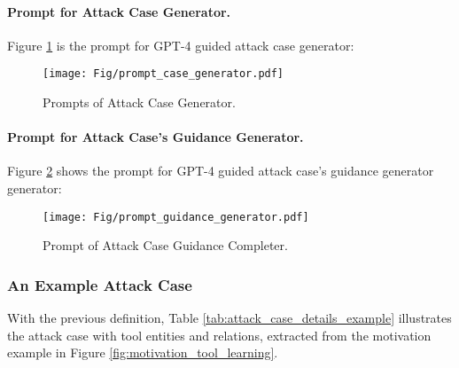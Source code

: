 \paragraph{Prompt for Attack Case Generator.}

Figure \ref{fig:prompt_case_generator} is the prompt for GPT-4 guided attack case generator:

\begin{figure}[htbp]
\centering
\texttt{[image: Fig/prompt\_case\_generator.pdf]}
\caption{Prompts of Attack Case Generator.}
\label{fig:prompt_case_generator}
\end{figure}

\paragraph{Prompt for Attack Case's Guidance Generator.}

Figure \ref{fig:prompt_guidance_case_generator} shows the prompt for GPT-4 guided attack case's guidance generator generator:

\begin{figure}[htbp]
\centering
\texttt{[image: Fig/prompt\_guidance\_generator.pdf]}
\caption{Prompt of Attack Case Guidance Completer.}
\label{fig:prompt_guidance_case_generator}
\end{figure}






\subsubsection{An Example Attack Case}

With the previous definition, Table \ref{tab:attack_case_details_example} illustrates the attack case with tool entities and relations, extracted from the motivation example in Figure \ref{fig:motivation_tool_learning}.







